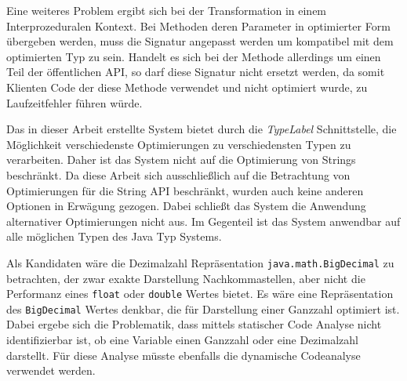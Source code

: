Eine weiteres Problem ergibt sich bei der Transformation in einem Interprozeduralen Kontext. Bei Methoden 
deren Parameter in optimierter Form übergeben werden, muss die Signatur angepasst werden um
kompatibel mit dem optimierten Typ zu sein. Handelt es sich bei der Methode allerdings um einen
Teil der öffentlichen API, so darf diese Signatur nicht ersetzt werden, da somit Klienten Code
der diese Methode verwendet und nicht optimiert wurde, zu Laufzeitfehler führen würde.  

Das in dieser Arbeit erstellte System bietet durch die \textit{TypeLabel} Schnittstelle, die 
Möglichkeit verschiedenste Optimierungen zu verschiedensten Typen zu verarbeiten. Daher ist
das System nicht auf die Optimierung von Strings beschränkt. Da diese Arbeit sich 
ausschließlich auf die Betrachtung von Optimierungen für die String API beschränkt, wurden
auch keine anderen Optionen in Erwägung gezogen. Dabei schließt das System die Anwendung 
alternativer Optimierungen nicht aus. Im Gegenteil ist das System anwendbar auf alle 
möglichen Typen des Java Typ Systems. 

Als Kandidaten wäre die Dezimalzahl Repräsentation \texttt{java.math.BigDecimal} zu betrachten,
der zwar exakte Darstellung Nachkommastellen, aber nicht die Performanz eines \texttt{float} oder
\texttt{double} Wertes bietet. Es wäre eine Repräsentation des \texttt{BigDecimal} Wertes denkbar,
die für Darstellung einer Ganzzahl optimiert ist. Dabei ergebe sich die Problematik, dass mittels
statischer Code Analyse nicht identifizierbar ist, ob eine Variable einen Ganzzahl oder eine
Dezimalzahl darstellt. Für diese Analyse müsste ebenfalls die dynamische Codeanalyse verwendet werden.


